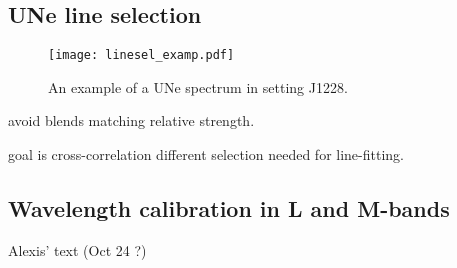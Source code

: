 \subsection{UNe line selection}
\label{sec:uneselect}


\begin{figure}[ht]
    \begin{center}
\texttt{[image: linesel\_examp.pdf]}
\end{center}
\caption{An example of a UNe spectrum in setting J1228. }
\label{fig:linesel}
\end{figure}


avoid blends
matching relative strength.

goal is cross-correlation
different selection needed for line-fitting.

\subsection{Wavelength calibration in L and M-bands}

Alexis' text (Oct 24 ?)

